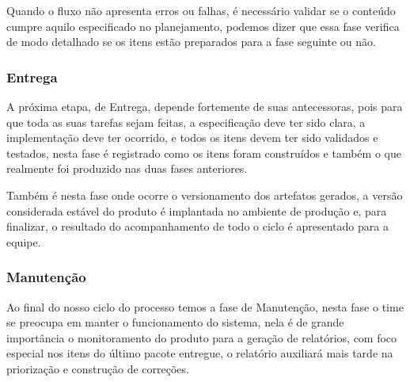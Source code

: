 \documentclass[	DIV=calc,%
							paper=a4,%
							fontsize=12pt,%
							onecolumn]{scrartcl}	 					%
\begin{document}
	 Quando o fluxo não apresenta erros ou falhas, é necessário validar se o conteúdo cumpre aquilo especificado no planejamento, podemos dizer que essa fase verifica de modo detalhado se os itens estão preparados para a fase seguinte ou não. 
	
	\subsubsection{Entrega}
	A próxima etapa, de Entrega, depende fortemente de suas antecessoras, pois para que toda as suas tarefas sejam feitas, a especificação deve ter sido clara, a implementação deve ter ocorrido, e todos os itens devem ter sido validados e testados, nesta fase é registrado como os itens foram construídos e também o que realmente foi produzido nas duas fases anteriores. 
	
	Também é nesta fase onde ocorre o versionamento dos artefatos gerados, a versão considerada estável do produto é implantada no ambiente de produção e, para finalizar, o resultado do acompanhamento de todo o ciclo é apresentado para a equipe. 
	
	\subsubsection{Manutenção}
	Ao final do nosso ciclo do processo temos a fase de Manutenção, nesta fase o time se preocupa em manter o funcionamento do sistema, nela é de grande importância o monitoramento do produto para a geração de relatórios, com foco especial nos itens do último pacote entregue, o relatório auxiliará mais tarde na priorização e construção de correções. 
\end{document}
